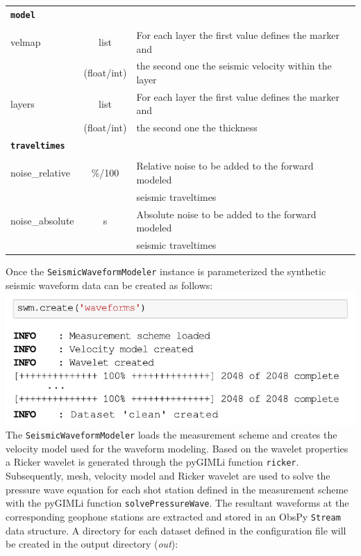\documentclass[a4paper,fleqn]{cas-sc}
\begin{document}
\begin{table}[]
\begin{tabular*}{\tblwidth}{@{} LCL@{}}
        \midrule
        \textbf{\texttt{model}} & & \\
         & & \\
        velmap & list & For each layer the first value defines the marker and \\
         & (float/int) & the second one the seismic velocity within the layer \\
        layers & list & For each layer the first value defines the marker and \\
         & (float/int) & the second one the thickness \\
        \midrule
        \textbf{\texttt{traveltimes}} & & \\
         & & \\
        noise\_relative & \%/100 & Relative noise to be added to the forward modeled \\
      	 & & seismic traveltimes \\
        noise\_absolute & s & Absolute noise to be added to the forward modeled \\
         & & seismic traveltimes\\
        \bottomrule
    \end{tabular*}
    \label{tab:config}
\end{table}
Once the \texttt{SeismicWaveformModeler} instance is parameterized the synthetic seismic waveform data can be created as follows:
\newline
\includegraphics[width=.5\textwidth]{./figures/create_syn_data.pdf}
\newline
The \texttt{SeismicWaveformModeler} loads the measurement scheme 
and creates the velocity model used for the waveform modeling.
Based on the wavelet properties a Ricker wavelet is generated through the pyGIMLi function \texttt{ricker}.
Subsequently, mesh, velocity model and Ricker wavelet are used to solve the pressure wave equation for each shot station defined in the measurement scheme with the pyGIMLi function \texttt{solvePressureWave}.
The resultant waveforms at the corresponding geophone stations are extracted and stored in an ObsPy \texttt{Stream} data structure.
\clearpage
A directory for each dataset defined in the configuration file will be created in the output directory (\textit{out}):
\end{document}
